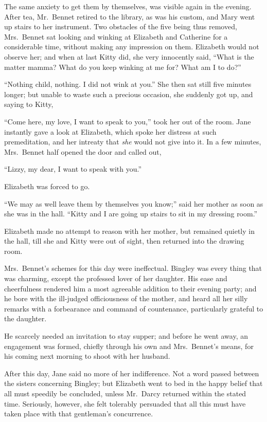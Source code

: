 The same anxiety to get them by themselves, was
visible again in the evening. After tea, Mr.\ Bennet retired
to the library, as was his custom, and Mary went up stairs
to her instrument. Two obstacles of the five being thus
removed, Mrs.\ Bennet sat looking and winking at Elizabeth
and Catherine for a considerable time, without making
any impression on them. Elizabeth would not observe
her; and when at last Kitty did, she very innocently
said, “What is the matter mamma? What do you keep
winking at me for? What am I to do?”

“Nothing child, nothing. I did not wink at you.”
She then sat still five minutes longer; but unable to
waste such a precious occasion, she suddenly got up, and
saying to Kitty,

“Come here, my love, I want to speak to you,” took
her out of the room. Jane instantly gave a look at Elizabeth,
which spoke her distress at such premeditation, and
her intreaty that \textit{she} would not give into it. In a few
minutes, Mrs.\ Bennet half opened the door and called out,

“Lizzy, my dear, I want to speak with you.”

Elizabeth was forced to go.

“We may as well leave them by themselves you
know;” said her mother as soon as she was in the hall.
“Kitty and I are going up stairs to sit in my dressing room.”

Elizabeth made no attempt to reason with her mother,
but remained quietly in the hall, till she and Kitty were
out of sight, then returned into the drawing room.

Mrs.\ Bennet’s schemes for this day were ineffectual.
Bingley was every thing that was charming, except the
professed lover of her daughter. His ease and cheerfulness
rendered him a most agreeable addition to their evening
party; and he bore with the ill-judged officiousness of
the mother, and heard all her silly remarks with a forbearance
and command of countenance, particularly
grateful to the daughter.

He scarcely needed an invitation to stay supper; and
before he went away, an engagement was formed, chiefly
through his own and Mrs.\ Bennet’s means, for his coming
next morning to shoot with her husband.

After this day, Jane said no more of her indifference.
Not a word passed between the sisters concerning Bingley;
but Elizabeth went to bed in the happy belief that all
must speedily be concluded, unless Mr.\ Darcy returned
within the stated time. Seriously, however, she felt
tolerably persuaded that all this must have taken place
with that gentleman’s concurrence.

